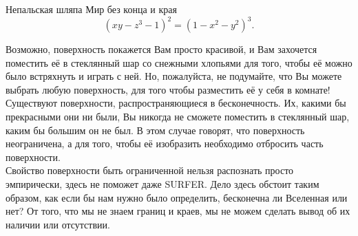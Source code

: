 \begin{surferPage}{Непальская шляпа}
Мир без конца и края \\

\smallskip
\[(x y - z^3 -1)^2= (1 - x^2	- y^2)^3.\]

\singlespacing
Возможно, поверхность покажется Вам просто красивой, и Вам захочется поместить её в стеклянный шар со снежными хлопьями для того, чтобы её можно было встряхнуть и играть с ней. Но, пожалуйста, не подумайте, что Вы можете выбрать любую поверхность, для того чтобы разместить её у себя в комнате!
\\
\singlespacing
Существуют поверхности, распространяющиеся в бесконечность. Их, какими бы прекрасными они ни были, Вы никогда не сможете поместить в стеклянный шар, каким бы большим он не был. В этом случае говорят, что поверхность неограничена, а для того, чтобы её изобразить необходимо отбросить часть поверхности.
\\
\singlespacing
Свойство поверхности быть ограниченной нельзя распознать просто эмпирически, здесь не поможет даже SURFER. Дело здесь обстоит таким образом, как если бы нам нужно было определить, бесконечна ли Вселенная или нет? От того, что мы не знаем границ и краев, мы не можем сделать вывод об их наличии или отсутствии.
\end{surferPage}
